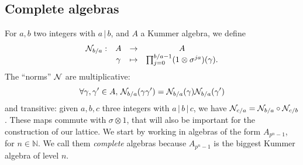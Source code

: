 \documentclass{sig-alternate}
\begin{document}
\subsection{Complete algebras}

For $a, b$ two integers with $a\,|\,b$, and $A$ a Kummer
algebra, we define
\[
\begin{array}{cccc}
  \mathcal{N}_{b/a}: & A & \to & A \\
  & \gamma & \mapsto & \prod_{j=0}^{b/a-1} (1 \otimes
  \sigma^{ja})(\gamma).
\end{array}
\]
The ``norms'' $\mathcal{N}$ are multiplicative:
\[
  \forall\gamma, \gamma'\in A,\,\mathcal{N}_{b/a}(\gamma\gamma')=\mathcal{N}_{b/a}(\gamma)\mathcal{N}_{b/a}(\gamma')
\]
and transitive: given $a, b, c$ three integers with
$a\,|\,b\,|\,c$, we have $\mathcal{N}_{c/a} = \mathcal{N}_{b/a}\circ\mathcal{N}_{c/b}$. These maps 
commute with $\sigma\otimes1$, that will also be important for the construction
of our lattice. We start by working in algebras of the form $A_{p^n-1}$, for
$n\in\mathbb{N}$. We call them \emph{complete} algebras because
$A_{p^n-1}$ is the biggest Kummer algebra of level $n$.
\end{document}
